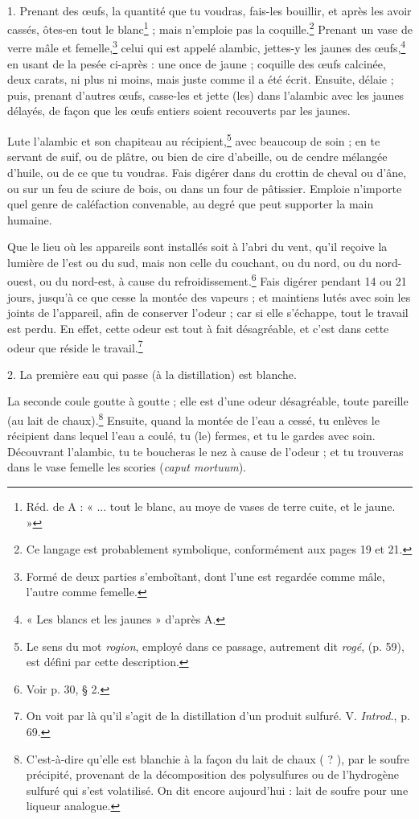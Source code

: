 \documentclass[landscape, a4paper, 11pt, oneside, polutonikogreek, french]{article}
\begin{document}
\paragraph{}
1. Prenant des œufs, la quantité que tu voudras, fais-les bouillir, et après les avoir cassés, ôtes-en tout le blanc\footnote{Réd. de A : « ... tout le blanc, au moye de vases de terre cuite, et le jaune. »} ; mais n'emploie pas la coquille.\footnote{Ce langage est probablement symbolique, conformément aux pages 19 et 21.} Prenant un vase de verre mâle et femelle,\footnote{Formé de deux parties s'emboîtant, dont l'une est regardée comme mâle, l'autre comme femelle.} celui qui est appelé alambic, jettes-y les jaunes des œufs,\footnote{« Les blancs et les jaunes » d'après A.} en usant de la pesée ci-après : une once de jaune ; coquille des œufs calcinée, deux carats, ni plus ni moins, mais juste comme il a été écrit. Ensuite, délaie ; puis, prenant d'autres œufs, casse-les et jette (les) dans l'alambic avec les jaunes délayés, de façon que les œufs entiers soient recouverts par les jaunes.

Lute l'alambic et son chapiteau au récipient,\footnote{Le sens du mot \emph{rogion}, employé dans ce passage, autrement dit \emph{rogé}, (p. 59), est défini par cette description.} avec beaucoup de soin ; en te servant de suif, ou de plâtre, ou bien de cire d'abeille, ou de cendre mélangée d'huile, ou de ce que tu voudras. Fais digérer dans du crottin de cheval ou d'âne, ou sur un feu de sciure de bois, ou dans un four de pâtissier. Emploie n'importe quel genre de caléfaction convenable, au degré que peut supporter la main humaine.

Que le lieu où les appareils sont installés soit à l'abri du vent, qu'il reçoive la lumière de l'est ou du sud, mais non celle du couchant, ou du nord, ou du nord-ouest, ou du nord-est, à cause du refroidissement.\footnote{Voir p. 30, § 2.} Fais digérer pendant 14 ou 21 jours, jusqu'à ce que cesse la montée des vapeurs ; et maintiens lutés avec soin les joints de l'appareil, afin de conserver l'odeur ; car si elle s'échappe, tout le travail est perdu. En effet, cette odeur est tout à fait désagréable, et c'est dans cette odeur que réside le travail.\footnote{On voit par là qu'il s'agit de la distillation d'un produit sulfuré. V. \emph{Introd.}, p. 69.}

2. La première eau qui passe (à la distillation) est blanche.

La seconde coule goutte à goutte ; elle est d'une odeur désagréable, toute pareille (au lait de chaux).\footnote{C'est-à-dire qu'elle est blanchie à la façon du lait de chaux ( ? ), par le soufre précipité, provenant de la décomposition des polysulfures ou de l'hydrogène sulfuré qui s'est volatilisé. On dit encore aujourd'hui : lait de soufre pour une liqueur analogue.} Ensuite, quand la montée de l'eau a cessé, tu enlèves le récipient dans lequel l'eau a coulé, tu (le) fermes, et tu le gardes avec soin. Découvrant l'alambic, tu te boucheras le nez à cause de l'odeur ; et tu trouveras dans le vase femelle les scories (\emph{caput mortuum}).
\end{document}
